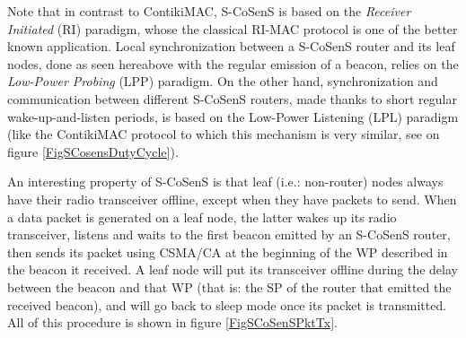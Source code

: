 \documentclass[a4paper,twoside]{article}
\begin{document}
Note that in contrast to ContikiMAC, S-CoSenS is based on the \emph{Receiver
Initiated} (RI) paradigm, whose the classical RI-MAC protocol \cite{RIMAC}
is one of the better known application.
Local synchronization between a S-CoSenS router and its leaf nodes, done
as seen hereabove with the regular emission of a beacon, relies on the
\emph{Low-Power Probing} (LPP) paradigm.
On the other hand, synchronization and communication between different
S-CoSenS routers, made thanks to short regular wake-up-and-listen periods,
is based on the Low-Power Listening (LPL) paradigm (like the ContikiMAC
protocol to which this mechanism is very similar, see on figure
\ref{FigSCosensDutyCycle}).

An interesting property of S-CoSenS is that leaf (i.e.: non-router) nodes
always have their radio transceiver offline, except when they have packets
to send. When a data packet is generated on a leaf node, the latter wakes up
its radio transceiver, listens and waits to the first beacon emitted by
an S-CoSenS router, then sends its packet using CSMA/CA at the beginning
of the WP described in the beacon it received. A leaf node will put its
transceiver offline during the delay between the beacon and that WP
(that is: the SP of the router that emitted the received beacon), and
will go back to sleep mode once its packet is transmitted.
All of this procedure is shown in figure \ref{FigSCoSenSPktTx}.
\end{document}
